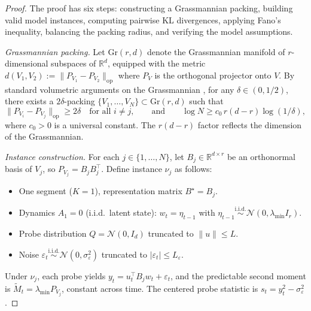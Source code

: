 \documentclass[12pt]{article}
\newcommand{\R}{\mathbb{R}}
\newcommand{\op}{\mathrm{op}}
\theoremstyle{plain}
\theoremstyle{definition}
\begin{document}
\begin{proof}
The proof has six steps: constructing a Grassmannian packing, building valid model instances, computing pairwise KL divergences, applying Fano's inequality, balancing the packing radius, and verifying the model assumptions.

\emph{Grassmannian packing.}
Let $\mathrm{Gr}(r, d)$ denote the Grassmannian manifold of $r$-dimensional subspaces of $\R^d$, equipped with the metric $d(V_1, V_2) := \|P_{V_1} - P_{V_2}\|_{\op}$ where $P_V$ is the orthogonal projector onto $V$.
By standard volumetric arguments on the Grassmannian \citep{edelman1998geometry, pajor1998metric}, for any $\delta \in (0, 1/2)$, there exists a $2\delta$-packing $\{V_1, \ldots, V_N\} \subset \mathrm{Gr}(r, d)$ such that
\begin{equation}
\|P_{V_i} - P_{V_j}\|_{\op} \ge 2\delta \quad \text{for all } i \neq j,
\qquad \text{and} \qquad
\log N \ge c_0\, r(d - r) \log(1/\delta),
\label{eq:packing}
\end{equation}
where $c_0 > 0$ is a universal constant. The $r(d-r)$ factor reflects the dimension of the Grassmannian.

\emph{Instance construction.}
For each $j \in \{1, \ldots, N\}$, let $B_j \in \R^{d \times r}$ be an orthonormal basis of $V_j$, so $P_{V_j} = B_j B_j^\top$. Define instance $\nu_j$ as follows:
\begin{itemize}[nosep]
\item One segment ($K = 1$), representation matrix $B^\star = B_j$.
\item Dynamics $A_1 = 0$ (i.i.d.\ latent state): $w_t = \eta_{t-1}$ with $\eta_{t-1} \stackrel{\mathrm{i.i.d.}}{\sim} \mathcal{N}(0, \lambda_{\min} I_r)$.
\item Probe distribution $Q = \mathcal{N}(0, I_d)$ truncated to $\|u\| \le L$.
\item Noise $\varepsilon_t \stackrel{\mathrm{i.i.d.}}{\sim} \mathcal{N}(0, \sigma_\varepsilon^2)$ truncated to $|\varepsilon_t| \le L_\varepsilon$.
\end{itemize}
Under $\nu_j$, each probe yields $y_t = u_t^\top B_j w_t + \varepsilon_t$, and the predictable second moment is $\widetilde{M}_t = \lambda_{\min} P_{V_j}$, constant across time. The centered probe statistic is $s_t = y_t^2 - \sigma_\varepsilon^2$.


\end{proof}
\end{document}
